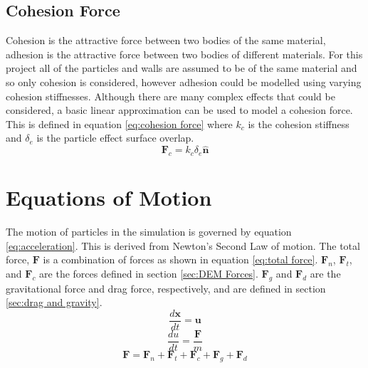 \documentclass[10pt,a4paper,titlepage]{report}
\begin{document}
\subsection{Cohesion Force}
Cohesion is the attractive force between two bodies of the same material, adhesion is the attractive force between two bodies of different materials. For this project all of the particles and walls are assumed to be of the same material and so only cohesion is considered, however adhesion could be modelled using varying cohesion stiffnesses. Although there are many complex effects that could be considered\cite{tuley}, a basic linear approximation can be used to model a cohesion force. This is defined in equation \ref{eq:cohesion force} where $k_c$ is the cohesion stiffness and $\delta_e$ is the particle effect surface overlap.
\begin{equation}
\mathbf{F}_{c} = k_{c} \delta_{e} \mathbf{\hat{n}}
\label{eq:cohesion force}
\end{equation}
\section{Equations of Motion}
The motion of particles in the simulation is governed by equation \ref{eq:acceleration}. This is derived from Newton's Second Law of motion. The total force, $\mathbf{F}$ is a combination of forces as shown in equation \ref{eq:total force}. $\mathbf{F}_{n}$, $\mathbf{F}_{t}$, and $\mathbf{F}_{c}$ are the forces defined in section \ref{sec:DEM Forces}. $\mathbf{F}_{g}$ and $\mathbf{F}_{d}$ are the gravitational force and drag force, respectively, and are defined in section \ref{sec:drag and gravity}.
\begin{equation}
\dfrac{d\mathbf{x}}{dt} = \mathbf{u}
\label{eq:position}
\end{equation}
\begin{equation}
\dfrac{du}{dt} = \dfrac{\mathbf{F}}{m}
\label{eq:acceleration}
\end{equation}
\begin{equation}
\mathbf{F} = \mathbf{F}_{n} + \mathbf{F}_{t} + \mathbf{F}_{c} + \mathbf{F}_{g} + \mathbf{F}_{d}
\label{eq:total force}
\end{equation}
\end{document}
